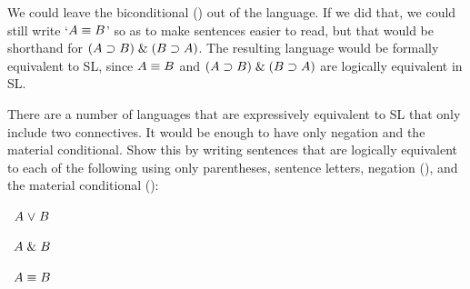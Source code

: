 \problempart
{}\label{pr.altConnectives}
We could leave the biconditional (\eiff) out of the language. If we did that, we could still write `$A\equiv B$' so as to make sentences easier to read, but that would be shorthand for $(A\supset B) \mathrel\& (B\supset A)$. The resulting language would be formally equivalent to SL, since $A\equiv B$ and $(A\supset B) \mathrel\& (B\supset A)$ are logically equivalent in SL.

There are a number of languages that are expressively equivalent to SL that only include two connectives.
It would be enough to have only negation and the material conditional.
Show this by writing sentences that are logically equivalent to each of the following using only parentheses, sentence letters, negation (\enot), and the material conditional (\eif):
\begin{earg}
\item\leftsolutions\ $A\mkern1mu\vee\mkern1mu B$
\item\leftsolutions\ $A\mathrel\& B$
\item\leftsolutions\ $A\equiv B$
\end{earg}

